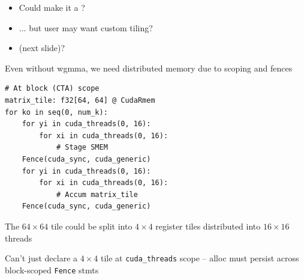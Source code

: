 \begin{minipage}[t]{0.48\textwidth}\fixminipage
\begin{itemize}
  \item Could make it a ?
  \item ... but user may want custom tiling?
  \item {} (next slide)?
\end{itemize}


Even without wgmma, we need distributed memory due to scoping and fences

\begin{verbatim}
# At block (CTA) scope
matrix_tile: f32[64, 64] @ CudaRmem
for ko in seq(0, num_k):
    for yi in cuda_threads(0, 16):
        for xi in cuda_threads(0, 16):
            # Stage SMEM
    Fence(cuda_sync, cuda_generic)
    for yi in cuda_threads(0, 16):
        for xi in cuda_threads(0, 16):
            # Accum matrix_tile
    Fence(cuda_sync, cuda_generic)
\end{verbatim}

The $64 \times 64$ tile could be split into $4 \times 4$ register tiles distributed into $16 \times 16$ threads

Can't just declare a $4 \times 4$ tile at \texttt{cuda\_threads} scope -- alloc must persist across block-scoped \texttt{Fence} stmts
\end{minipage}

\newpage
{}

